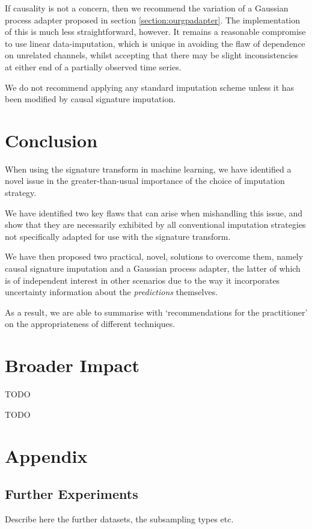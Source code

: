 \documentclass{article}
\begin{document}
If causality is not a concern, then we recommend the variation of a Gaussian process adapter proposed in section \ref{section:ourgpadapter}. The implementation of this is much less straightforward, however. It remains a reasonable compromise to use linear data-imputation, which is unique in avoiding the flaw of dependence on unrelated channels, whilst accepting that there may be slight inconsistencies at either end of a partially observed time series.

We do not recommend applying any standard imputation scheme unless it has been modified by causal signature imputation.

\section{Conclusion}
When using the signature transform in machine learning, we have identified a novel issue in the greater-than-usual importance of the choice of imputation strategy.

We have identified two key flaws that can arise when mishandling this issue, and show that they are necessarily exhibited by all conventional imputation strategies not specifically adapted for use with the signature transform.

We have then proposed two practical, novel, solutions to overcome them,
namely causal signature imputation and a Gaussian process adapter, the
latter of which is of independent interest in other scenarios due to the
way it incorporates uncertainty information about the \emph{predictions}
themselves.

As a result, we are able to summarise with `recommendations for the practitioner' on the appropriateness of different techniques.

\section*{Broader Impact}
TODO

\begin{ack}
TODO
\end{ack}


\newpage
\appendix

\section{Appendix}\label{sec:Appendix}
\subsection{Further Experiments}\label{supp:Experiments}
Describe here the further datasets, the subsampling types etc.
\end{document}
